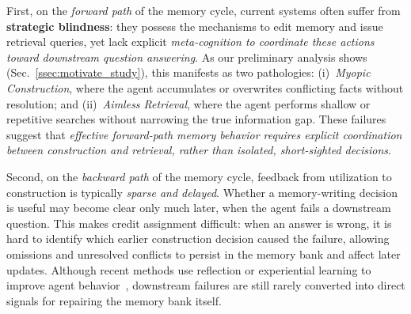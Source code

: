 First, on the \emph{forward path} of the memory cycle, current systems often suffer from \textbf{strategic blindness}: they possess the mechanisms to edit memory and issue retrieval queries, yet lack explicit \textit{meta-cognition to coordinate these actions toward downstream question answering}.
As our preliminary analysis shows (Sec.~\ref{ssec:motivate_study}), this manifests as two pathologies:
(i)~\emph{Myopic Construction}, where the agent accumulates or overwrites conflicting facts without resolution; and
(ii)~\emph{Aimless Retrieval}, where the agent performs shallow or repetitive searches without narrowing the true information gap.
These failures suggest that \textit{effective forward-path memory behavior requires explicit coordination between construction and retrieval, rather than isolated, short-sighted decisions}.

Second, on the \emph{backward path} of the memory cycle, feedback from utilization to construction is typically \emph{sparse and delayed}.
Whether a memory-writing decision is useful may become clear only much later, when the agent fails a downstream question.
This makes credit assignment difficult: when an answer is wrong, it is hard to identify which earlier construction decision caused the failure, allowing omissions and unresolved conflicts to persist in the memory bank and affect later updates.
Although recent methods use reflection or experiential learning to improve agent behavior~\cite{shinn2023reflexion,zhao2024expel,zhang2026memrl}, downstream failures are still rarely converted into direct signals for repairing the memory bank itself.

